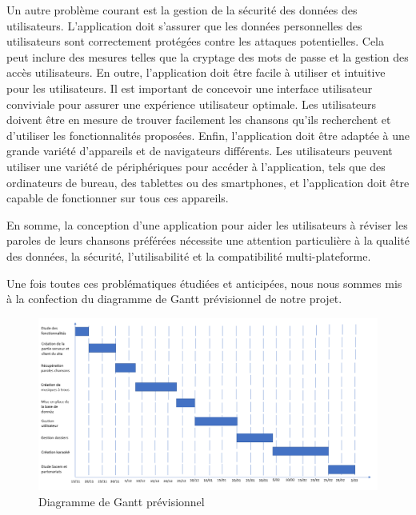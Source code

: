\documentclass[12pt,french]{article}
\begin{document}
Un autre problème courant est la gestion de la sécurité des données des utilisateurs. L'application doit s'assurer que les données personnelles des utilisateurs sont correctement protégées contre les attaques potentielles. Cela peut inclure des mesures telles que la cryptage des mots de passe et la gestion des accès utilisateurs.
En outre, l'application doit être facile à utiliser et intuitive pour les utilisateurs. Il est important de concevoir une interface utilisateur conviviale pour assurer une expérience utilisateur optimale. Les utilisateurs doivent être en mesure de trouver facilement les chansons qu'ils recherchent et d'utiliser les fonctionnalités proposées.
\newline
Enfin, l'application doit être adaptée à une grande variété d'appareils et de navigateurs différents. Les utilisateurs peuvent utiliser une variété de périphériques pour accéder à l'application, tels que des ordinateurs de bureau, des tablettes ou des smartphones, et l'application doit être capable de fonctionner sur tous ces appareils.
\newline

En somme, la conception d'une application pour aider les utilisateurs à réviser les paroles de leurs chansons préférées nécessite une attention particulière à la qualité des données, la sécurité, l'utilisabilité et la compatibilité multi-plateforme.
\newline
\newline

Une fois toutes ces problématiques étudiées et anticipées, nous nous sommes mis à la confection du diagramme de Gantt prévisionnel de notre projet.



\begin{figure}[H]
	\centering
	\includegraphics[scale=0.5]{ganttprevi.png}
	\caption{Diagramme de Gantt prévisionnel}    
\end{figure}
\end{document}
